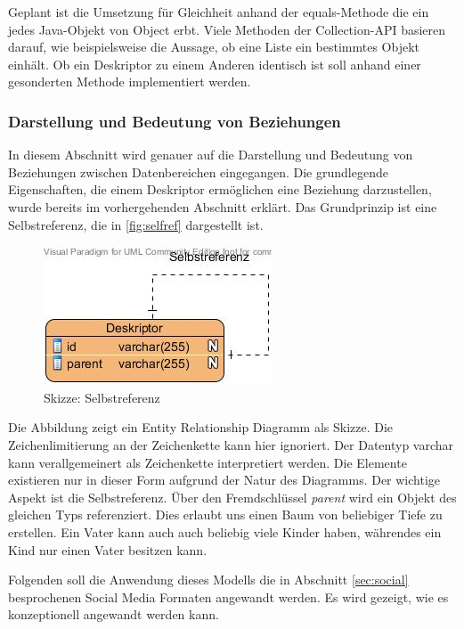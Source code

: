 \documentclass[a4paper]{article}
\begin{document}
	Geplant ist die Umsetzung für Gleichheit anhand der equals-Methode die ein
	jedes Java-Objekt von Object erbt. Viele Methoden der Collection-API basieren
	darauf, wie beispielsweise die Aussage, ob eine Liste ein bestimmtes Objekt
	einhält. Ob ein Deskriptor zu einem Anderen identisch ist soll anhand einer
	gesonderten Methode implementiert werden.
	
	\subsubsection{Darstellung und Bedeutung von Beziehungen}
	
	In diesem Abschnitt wird genauer auf die Darstellung und Bedeutung von 
	Beziehungen zwischen Datenbereichen eingegangen. Die grundlegende
	Eigenschaften, die einem Deskriptor ermöglichen eine Beziehung darzustellen,
	wurde bereits im vorhergehenden Abschnitt erklärt. Das Grundprinzip ist eine
	Selbstreferenz, die in \autoref{fig:selfref} dargestellt ist.
	
	\begin{figure}[H] 
		\centerline{
			\includegraphics{../Bilder/selfref.jpg}
		}
		\caption{Skizze: Selbstreferenz}
		\label{fig:selfref}
	\end{figure}
	
	Die Abbildung zeigt ein Entity Relationship Diagramm als Skizze. Die 
	Zeichenlimitierung an der Zeichenkette kann hier ignoriert. Der Datentyp 	
	varchar kann verallgemeinert als Zeichenkette interpretiert werden. Die
	Elemente existieren nur in dieser Form aufgrund der Natur des Diagramms.
	Der wichtige Aspekt ist die Selbstreferenz. Über den Fremdschlüssel
	\emph{parent} wird ein Objekt des gleichen Typs referenziert. Dies erlaubt
	uns einen Baum von beliebiger Tiefe zu erstellen. Ein Vater kann auch
	auch beliebig viele Kinder haben, währendes ein Kind nur einen Vater besitzen
	kann.
	
	Folgenden soll die Anwendung dieses Modells die in Abschnitt \ref{sec:social}
	besprochenen Social Media Formaten angewandt werden. Es wird gezeigt, wie es
	konzeptionell angewandt werden kann.
	
\end{document}
